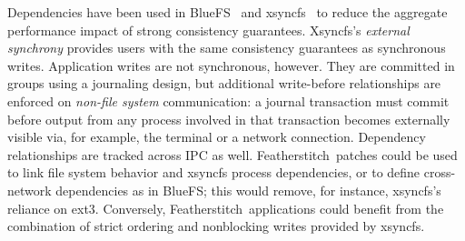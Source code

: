 \documentclass[9pt,twocolumn,letterpaper]{article}
\newcommand{\Kudos}{Featherstitch}
\newcommand{\Featherstitch}{\Kudos}
\newcommand{\patch}{patch}
\begin{document}
Dependencies have been used in
BlueFS~\cite{nightingale05speculative} and
xsyncfs~\cite{nightingale06rethink} to reduce the aggregate performance
impact of strong consistency guarantees.
%
Xsyncfs's \emph{external synchrony} provides users with
the same consistency guarantees as synchronous writes.
%
Application writes are not synchronous, however.
%
They are committed in groups using a journaling design, but
%
additional write-before relationships are enforced on
\emph{non-file system} communication: a journal transaction must commit
before output from any process involved in that transaction becomes externally
visible via, for example, the terminal or a network connection.
%
Dependency relationships are tracked across IPC as well.
%
\Featherstitch\ patches could be used to link file system behavior
and xsyncfs process dependencies, or to define cross-network dependencies
as in BlueFS; this would remove, for instance, xsyncfs's reliance
on ext3.
%
Conversely, \Featherstitch\ applications could benefit from the
combination of strict ordering and nonblocking writes provided by xsyncfs.
%
\begin{comment}
written by that transaction, \emph{or} any
data written by processes involved in that transaction's writes after that
transaction's data that might have been computed by a process that wrote
anything in that process.
%
depending on any write in
the assuming that commit

but the system
tracks any process output that followed---and, thus, might depend
on---these writes.
%
Any user-visible operation

the b operations are combined and com a journal, but a dependency subsystem
tracks

External synchrony~\cite{nightingale06rethink} builds on journaling to
automatically provide strict file system operation ordering for applications,
without requiring them to block on each write. It combines operations into a
journal, but tracks the activity of the calling processes after returning
control to them from the file system. If a process later performs some
\emph{user-visible} operation like printing text to the screen or sending
network traffic, the journal transaction containing the changes is forced to
commit before the process can continue.
%
External synchrony depends inherently on dependency tracking; dependencies
among processes with outstanding data are tracked to ensure that
uncommitted output never reaches a user. However, it also depends on a
particular file system consistency methodology, namely journaling, and it
is implemented only in an ext3-like file system called xsyncfs. \Kudos\
\patch\ dependencies could be a natural implementation strategy for its
dependencies, allowing them to apply to any file system.
%
Similar \patch-like dependencies are used to improve network file system
performance in BlueFS~\cite{nightingale05speculative}.
\end{comment}
\end{document}
